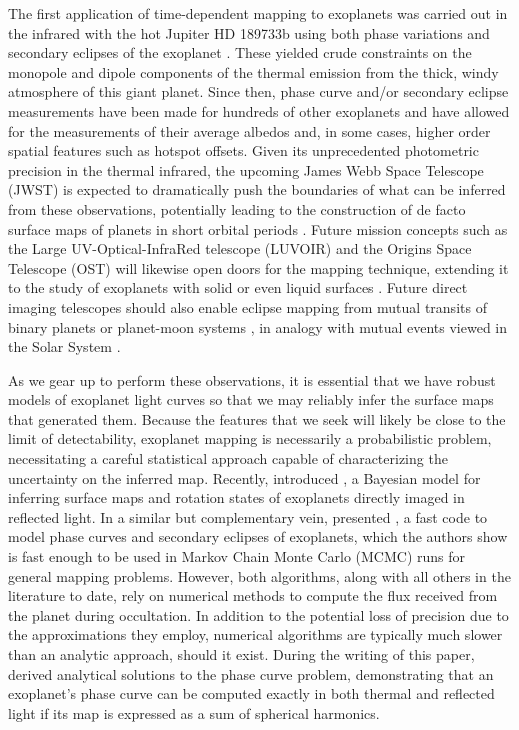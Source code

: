 \documentclass[modern]{aastex61}
\begin{document}
The first application of time-dependent mapping to exoplanets was carried out in the
infrared with the hot Jupiter HD 189733b using both phase variations and
secondary eclipses of the exoplanet \citep{Knutson2007,Majeau2012,deWit2012}.
These yielded crude constraints on the monopole and dipole components of the thermal
emission from the thick, windy atmosphere of this giant planet.
%
Since then, phase curve and/or secondary eclipse measurements have been made for
hundreds of other exoplanets \citep[e.g.,][]{Shabram2016, Jansen2017, Adams2018} and have allowed for
the measurements of their average albedos and, in some cases, higher order spatial features
such as hotspot offsets. Given its unprecedented photometric precision in the thermal infrared,
the upcoming James Webb Space Telescope (JWST) is expected to dramatically push the boundaries of
what can be inferred from these observations, potentially leading to the construction of de facto
surface maps of planets in short orbital periods \citep{Beichman2014,Schlawin2018}.
%
Future mission concepts such as the Large UV-Optical-InfraRed telescope (LUVOIR) and the
Origins Space Telescope (OST) will likewise open doors for the mapping technique,
extending it to the study of exoplanets with solid or even liquid surfaces
\citep[e.g.,][]{KawaharaFujii2010,KawaharaFujii2011,FujiiKawahara2012,Cowan2012,CowanFuentesHaggard2013,CowanFujii2017,Fujii2017,LugerLustigYaegerAgol2017,BerdyuginaKuhn2017}.
Future direct imaging telescopes should also enable eclipse mapping from
mutual transits of binary planets or planet-moon systems \citep{Cabrera2007},
in analogy with mutual events viewed in the Solar System
\citep{Brinkmann1973,Vermilion1974,Herzog1975,Brinkmann1976,Reinsch1994,Young1999,
Young2001,Livengood2011}.

As we gear up to perform these observations, it is essential that we have
robust models of exoplanet light curves so
that we may reliably infer the surface maps that generated them. Because the
features that we seek will likely be close to the limit of detectability,
exoplanet mapping is necessarily a probabilistic problem, necessitating
a careful statistical approach capable of characterizing the uncertainty
on the inferred map. Recently, \citet{Farr2018} introduced \exocartographer,
a Bayesian model for inferring surface maps and rotation states
of exoplanets directly imaged in reflected light. In a similar but
complementary vein, \citet{Louden2018} presented \spiderman, a fast
code to model phase curves and secondary eclipses of exoplanets, which
the authors show is fast enough to be used in Markov Chain Monte Carlo
(MCMC) runs for general mapping problems. However, both algorithms, along with all
others in the literature to date, rely on numerical methods to compute
the flux received from the planet during occultation. In addition to
the potential loss of precision due to the approximations they employ,
numerical algorithms are typically much slower than an analytic
approach, should it exist. During the writing of this paper, \citet{Haggard2018} derived
analytical solutions to the phase curve problem, demonstrating that an
exoplanet's phase curve can be computed exactly in both thermal and
reflected light if its map is expressed as a sum of spherical harmonics.
\end{document}
